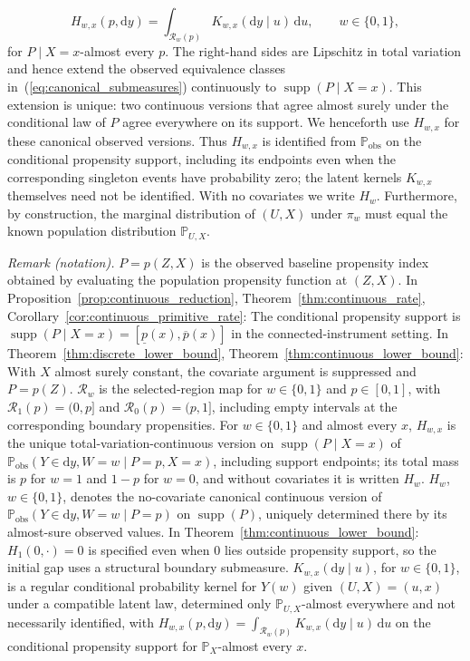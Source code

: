 \[
    H_{w,x}(p,\mathrm{d}y)=\int_{\mathcal{R}_w(p)} K_{w,x}(\mathrm{d}y\mid u)\,\mathrm{d}u,
    \qquad w\in\{0,1\},
\]
for $P\mid X=x$-almost every $p$. The right-hand sides are Lipschitz in total variation and hence extend the observed equivalence classes in~(\ref{eq:canonical_submeasures}) continuously to $\operatorname{supp}(P\mid X=x)$. This extension is unique: two continuous versions that agree almost surely under the conditional law of $P$ agree everywhere on its support. We henceforth use $H_{w,x}$ for these canonical observed versions. Thus $H_{w,x}$ is identified from $\mathbb P_{\mathrm{obs}}$ on the conditional propensity support, including its endpoints even when the corresponding singleton events have probability zero; the latent kernels $K_{w,x}$ themselves need not be identified. With no covariates we write $H_w$.
Furthermore, by construction, the marginal distribution of $(U, X)$ under $\pi_w$ must equal the known population distribution $\mathbb{P}_{U,X}$.

\noindent\textit{Remark (notation).} $P=p(Z,X)$ is the observed baseline propensity index obtained by evaluating the population propensity function at $(Z,X)$. In Proposition~\ref{prop:continuous_reduction}, Theorem~\ref{thm:continuous_rate}, Corollary~\ref{cor:continuous_primitive_rate}: The conditional propensity support is $\operatorname{supp}(P\mid X=x)=[\underline p(x),\overline p(x)]$ in the connected-instrument setting. In Theorem~\ref{thm:discrete_lower_bound}, Theorem~\ref{thm:continuous_lower_bound}: With $X$ almost surely constant, the covariate argument is suppressed and $P=p(Z)$. $\mathcal R_w$ is the selected-region map for $w\in\{0,1\}$ and $p\in[0,1]$, with $\mathcal R_1(p)=(0,p]$ and $\mathcal R_0(p)=(p,1]$, including empty intervals at the corresponding boundary propensities. For $w\in\{0,1\}$ and almost every $x$, $H_{w,x}$ is the unique total-variation-continuous version on $\operatorname{supp}(P\mid X=x)$ of $\mathbb P_{\mathrm{obs}}(Y\in\mathrm dy,W=w\mid P=p,X=x)$, including support endpoints; its total mass is $p$ for $w=1$ and $1-p$ for $w=0$, and without covariates it is written $H_w$. $H_w$, $w\in\{0,1\}$, denotes the no-covariate canonical continuous version of $\mathbb P_{\mathrm{obs}}(Y\in\mathrm{d}y,W=w\mid P=p)$ on $\operatorname{supp}(P)$, uniquely determined there by its almost-sure observed values. In Theorem~\ref{thm:continuous_lower_bound}: $H_1(0,\cdot)=0$ is specified even when $0$ lies outside propensity support, so the initial gap uses a structural boundary submeasure. $K_{w,x}(\mathrm dy\mid u)$, for $w\in\{0,1\}$, is a regular conditional probability kernel for $Y(w)$ given $(U,X)=(u,x)$ under a compatible latent law, determined only $\mathbb P_{U,X}$-almost everywhere and not necessarily identified, with $H_{w,x}(p,\mathrm dy)=\int_{\mathcal R_w(p)}K_{w,x}(\mathrm dy\mid u)\,\mathrm du$ on the conditional propensity support for $\mathbb P_X$-almost every $x$.


